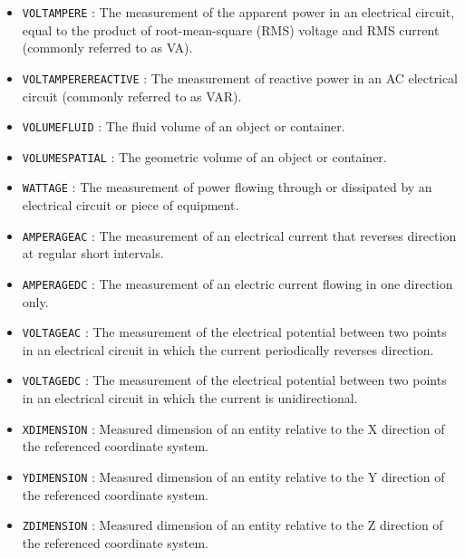 \begin{itemize}
\item \texttt{VOLT\textunderscore AMPERE} : The measurement of the apparent power in an electrical circuit, equal to the product of root-mean-square (RMS) voltage and RMS current (commonly referred to as VA). 

\item \texttt{VOLT\textunderscore AMPERE\textunderscore REACTIVE} : The measurement of reactive power in an AC electrical circuit (commonly referred to as VAR). 

\item \texttt{VOLUME\textunderscore FLUID} : The fluid volume of an object or container. 

\item \texttt{VOLUME\textunderscore SPATIAL} : The geometric volume of an object or container. 

\item \texttt{WATTAGE} : The measurement of power flowing through or dissipated by an electrical circuit or piece of equipment. 

\item \texttt{AMPERAGE\textunderscore AC} : The measurement of an electrical current that reverses direction at regular short intervals. 

\item \texttt{AMPERAGE\textunderscore DC} : The measurement of an electric current flowing in one direction only. 

\item \texttt{VOLTAGE\textunderscore AC} : The measurement of the electrical potential between two points in an electrical circuit in which the current periodically reverses direction. 

\item \texttt{VOLTAGE\textunderscore DC} : The measurement of the electrical potential between two points in an electrical circuit in which the current is unidirectional. 

\item \texttt{X\textunderscore DIMENSION} : Measured dimension of an entity relative to the X direction of the referenced coordinate system.
 

\item \texttt{Y\textunderscore DIMENSION} : Measured dimension of an entity relative to the Y direction of the referenced coordinate system. 

\item \texttt{Z\textunderscore DIMENSION} : Measured dimension of an entity relative to the Z direction of the referenced coordinate system. 


\end{itemize}
